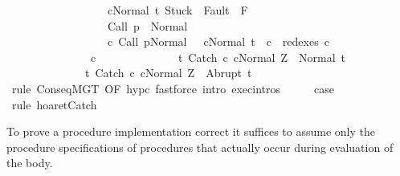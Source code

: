 \begin{isabellebody}
\ \ \ \ \ \ \ \ \ \ \ \ \ \ \ \ \ \ {\isasymGamma}{\isasymturnstile}{\isasymlangle}cNormal\ t{\isasymrangle}\ {\isasymRightarrow}{\isasymnotin}{\isacharparenleft}{\isacharbraceleft}Stuck{\isacharbraceright}\ {\isasymunion}\ Fault\ {\isacharbackquote}\ {\isacharparenleft}{\isacharminus}F{\isacharparenright}{\isacharparenright}\ {\isasymand}\ \isanewline
\ \ \ \ \ \ \ \ \ \ \ \ \ \ \ \ \ \ {\isasymGamma}{\isasymturnstile}Call\ p\ {\isasymdown}\ Normal\ {\isasymsigma}\ {\isasymand}\isanewline
\ \ \ \ \ \ \ \ \ \ \ \ \ \ \ \ \ \ {\isacharparenleft}{\isasymexists}c{\isacharprime}{\isachardot}\ {\isasymGamma}{\isasymturnstile}{\isacharparenleft}Call\ p{\isacharcomma}Normal\ {\isasymsigma}{\isacharparenright}\ {\isasymrightarrow}\isactrlsup {\isacharplus}\ {\isacharparenleft}c{\isacharprime}{\isacharcomma}Normal\ t{\isacharparenright}\ {\isasymand}\ c\ {\isasymin}\ redexes\ c{\isacharprime}{\isacharparenright}{\isacharbraceright}\ \isanewline
\ \ \ \ \ \ \ \ \ \ \ \ \ \ \ c\isanewline
\ \ \ \ \ \ \ \ \ \ \ \ \ \ {\isacharbraceleft}t{\isachardot}\ {\isasymGamma}{\isasymturnstile}{\isasymlangle}Catch\ c\ cNormal\ Z{\isasymrangle}\ {\isasymRightarrow}\ Normal\ t{\isacharbraceright}{\isacharcomma}\isanewline
\ \ \ \ \ \ \ \ \ \ \ \ \ \ {\isacharbraceleft}t{\isachardot}\ {\isasymGamma}{\isasymturnstile}{\isasymlangle}Catch\ c\ cNormal\ Z{\isasymrangle}\ {\isasymRightarrow}\ Abrupt\ t{\isacharbraceright}{\isachardoublequoteclose}\isanewline
\ \ \ \ \isamarkupfalse%
\ {\isacharparenleft}rule\ ConseqMGT\ {\isacharbrackleft}OF\ hyp{\isacharunderscore}c{}{\isacharbrackright}{\isacharparenright}\ {\isacharparenleft}fastforce\ intro{\isacharcolon}\ exec{\isachardot}intros{\isacharparenright}\isanewline
\ \ \isamarkupfalse%
\ \isamarkupfalse%
\ {\isacharquery}case\isanewline
\ \ \ \ \isamarkupfalse%
\ {\isacharparenleft}rule\ hoaret{\isachardot}Catch{\isacharparenright}\isanewline
{}\isamarkupfalse%
%
\endisatagproof
{\isafoldproof}%
%
\isadelimproof
%
\endisadelimproof
%
\begin{isamarkuptext}%
To prove a procedure implementation correct it suffices to assume
       only the procedure specifications of procedures that actually
       occur during evaluation of the body.%
\end{isamarkuptext}\isamarkuptrue%

\end{isabellebody}
